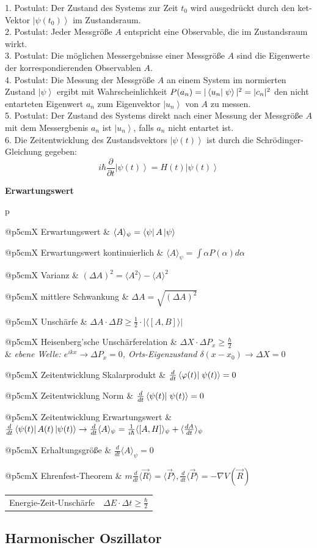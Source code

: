\documentclass[12pt,a4paper, twoside]{article}
\makeatletter
\renewcommand{\d}[2]{\frac{d #1}{d #2}}
\newcommand{\pd}[2]{\frac{\partial #1}{\partial #2}}
\newcommand{\ket}[1]{\left| #1 \right>}
\newcommand{\braket}[2]{\left< #1 \vphantom{#2} \right|
 \left. #2 \vphantom{#1} \right>}
\newcommand{\matrixel}[3]{\left< #1 \vphantom{#2#3} \right|
 #2 \left| #3 \vphantom{#1#2} \right>}
\renewcommand{\=}[1]{\stackrel{#1}{=}}
\newcommand{\erw}[1]{\langle #1 \rangle}
\theoremstyle{definition}
\theoremstyle{remark}
\newcommand{\concept}[2]{%
\noindent
\begin{framed}
\noindent\textbf{#1}
\par\begin{tabular}{p{\linewidth}}
#2
\end{tabular}
\end{framed}
}
\newcommand{\fnote}[3]{%
\noindent\begin{tabularx}{\linewidth}{@{}p{5cm}X}
#1 & $#2$\\
& \textit{\small{#3}}
\end{tabularx}}
\newcommand{\f}[2]{%
\noindent\begin{tabularx}{\linewidth}{@{}p{5cm}X}
#1 & $#2$
\end{tabularx}}
\makeatother
\begin{document}
\begin{center}
\begin{framed}
1. Postulat: Der Zustand des Systems zur Zeit $t_0$ wird ausgedrückt durch den ket-Vektor $\ket{\psi(t_0)}$ im Zustandsraum.\\
2. Postulat: Jeder Messgröße $A$ entspricht eine Observable, die im Zustandsraum wirkt.\\
3. Postulat: Die möglichen Messergebnisse einer Messgröße $A$ sind die Eigenwerte der korrespondierenden Observablen $A$.\\
4. Postulat: Die Messung der Messgröße $A$ an einem System im normierten Zustand $\ket{\psi}$ ergibt mit Wahrscheinlichkeit $P(a_n) = |\braket{u_n}{\psi}|^2 = |c_n|^2$ den nicht entarteten Eigenwert $a_n$ zum Eigenvektor $\ket{u_n}$ von $A$ zu messen.\\
5. Postulat: Der Zustand des Systems direkt nach einer Messung der Messgröße $A$ mit dem Messergbenis $a_n$ ist $\ket{u_n}$, falls $a_n$ nicht entartet ist.\\
6. Die Zeitentwicklung des Zustandsvektors $\ket{\psi(t)}$ ist durch die Schrödinger-Gleichung gegeben: $$i \hbar \pd{}{t} \ket{\psi(t)} = H(t) \ket{\psi(t)}$$
\end{framed}
\end{center}

\concept{Erwartungswert}{
\f{Erwartungswert}{\erw{A}_{\psi} = \matrixel{\psi}{A}{\psi}}
\f{Erwartungswert kontinuierlich}{\erw{A}_{\psi} = \int \alpha P(\alpha) d\alpha}
\f{Varianz}{(\Delta A)^2 = \erw{A^2} - \erw{A}^2}
\f{mittlere Schwankung}{\Delta A = \sqrt{(\Delta A)^2}}
\f{Unschärfe}{\Delta A \cdot \Delta B \geq \frac{1}{2} \cdot |\erw{[A,B]}|}
\fnote{Heisenberg'sche Unschärferelation}{\Delta X \cdot \Delta P_x \geq \frac{\hbar}{2}}{ebene Welle: $e^{ikx} \rightarrow \Delta P_x = 0$, Orts-Eigenzustand $\delta(x-x_0) \rightarrow \Delta X = 0$}
\f{Zeitentwicklung Skalarprodukt}{\d{}{t} \braket{\varphi(t)}{\psi(t)} = 0}
\f{Zeitentwicklung Norm}{\d{}{t} \braket{\psi(t)}{\psi(t)} = 0}
\f{Zeitentwicklung Erwartungswert}{\d{}{t} \matrixel{\psi(t)}{A(t)}{\psi(t)} \rightarrow \d{}{t} \erw{A}_{\psi} = \frac{1}{i\hbar} \erw{[A, H]}_{\psi} + \erw{\d{A}{t}}_{\psi}}
\f{Erhaltungsgröße}{\d{}{t}\erw{A}_{\psi} = 0}
\f{Ehrenfest-Theorem}{m \d{}{t} \erw{\vec R} = \erw{\vec P}, \d{}{t} \erw{\vec P} = - \nabla V(\vec R)}
\f{Energie-Zeit-Unschärfe}{\Delta E \cdot \Delta t \geq \frac{\hbar}{2}}}

\subsection{Harmonischer Oszillator}
\end{document}
